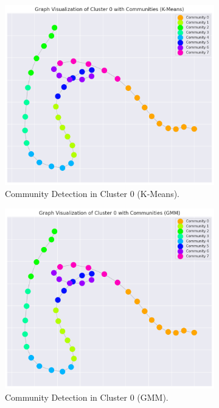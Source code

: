             \begin{figure}[H]
                \centering
                \begin{subfigure}[c]{0.47\textwidth}
                    \centering
                    \includegraphics[width=\textwidth]{../figures/plots/section3/k-means_graph_visualization_of_cluster_0_with_communities.png}
                    \caption{Community Detection in Cluster 0 (K-Means).}
                    \label{fig:kmeans_graph}
                \end{subfigure}
                \hfill
                \begin{subfigure}[c]{0.47\textwidth}
                    \centering
                    \includegraphics[width=\textwidth]{../figures/plots/section3/gmm_graph_visualization_of_cluster_0_with_communities.png}
                    \caption{Community Detection in Cluster 0 (GMM).}
                    \label{fig:gmm_graph}
                \end{subfigure}
                \vspace{-0.1cm}
                \caption{}
                \label{fig:}
            \end{figure}

